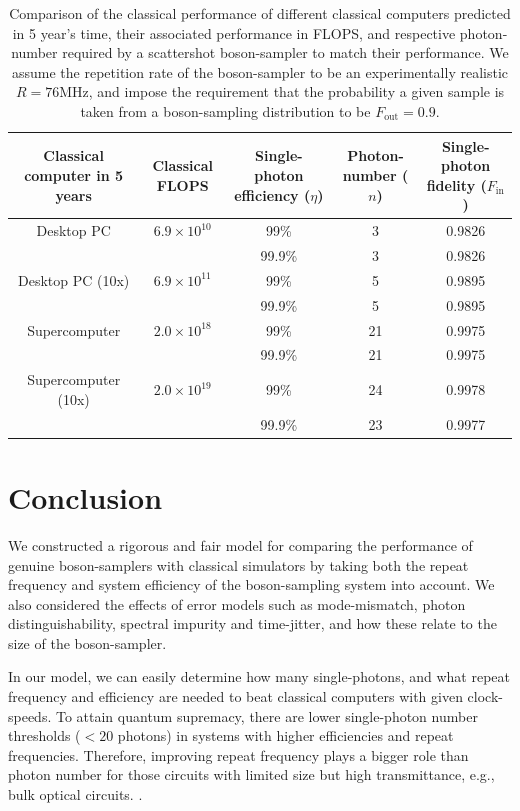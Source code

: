 \documentclass[aps,rmp,twocolumn,amsmath,amssymb,nofootinbib,superscriptaddress]{revtex4}
\newcommand{\comment}[1]{{\color{blue}{#1}}}
\begin{document}
\begin{table}[!htb]
\begin{tabular}{|c|c|c|c|c|}
\hline
Classical computer in 5 years & Classical FLOPS & Single-photon efficiency ($\eta$) & Photon-number ($n$) & Single-photon fidelity ($F_\mathrm{in}$) \\
\hline
\hline
Desktop PC & $6.9\times 10^{10}$ & 99\% & 3 & 0.9826 \\
 & & 99.9\% & 3 & 0.9826 \\
\hline
Desktop PC (10x) & $6.9\times 10^{11}$ & 99\% & 5 & 0.9895 \\
 & & 99.9\% & 5 & 0.9895 \\
\hline
Supercomputer & $2.0\times 10^{18}$ & 99\% & 21 & 0.9975 \\
 & & 99.9\% & 21 & 0.9975 \\
\hline
Supercomputer (10x) & $2.0\times 10^{19}$ & 99\% & 24 & 0.9978 \\
 & & 99.9\% & 23 & 0.9977 \\
\hline
\end{tabular} \caption{Comparison of the classical performance of different classical computers predicted in 5 year's time, their associated performance in FLOPS, and respective photon-number required by a scattershot boson-sampler to match their performance. We assume the repetition rate of the boson-sampler to be an experimentally realistic \mbox{$R=76\mathrm{MHz}$}, and impose the requirement that the probability a given sample is taken from a boson-sampling distribution to be \mbox{$F_\mathrm{out}=0.9$}. \comment{Zuen: Please confirm that for your calculatins $\eta$ is the single-photon efficiency, not the net efficiency.}} \label{tab:benchmark_outperform}
\end{table}

\section{Conclusion} \label{sec:conclusion}

We constructed a rigorous and fair model for comparing the performance of genuine boson-samplers with classical simulators by taking both the repeat frequency and system efficiency of the boson-sampling system into account. We also considered the effects of error models such as mode-mismatch, photon distinguishability, spectral impurity and time-jitter, and how these relate to the size of the boson-sampler.

In our model, we can easily determine how many single-photons, and what repeat frequency and efficiency are needed to beat classical computers with given clock-speeds. To attain quantum supremacy, there are lower single-photon number thresholds ($<20$ photons) in systems with higher efficiencies and repeat frequencies. Therefore, improving repeat frequency plays a bigger role than photon number for those circuits with limited size but high transmittance, e.g., bulk optical circuits. \comment{Don't quite understand this last sentence}.
\end{document}
